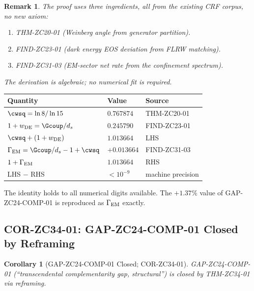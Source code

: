 \documentclass[12pt, a4paper]{article}
\newtheorem{corollary}{Corollary}[section]
\newtheorem{remark}{Remark}[section]
\begin{document}
\begin{remark}
The proof uses three ingredients, all from the existing CRF
corpus, no new axiom:
\begin{enumerate}[leftmargin=*, noitemsep]
  \item THM-ZC20-01 (Weinberg angle from generator partition).
  \item FIND-ZC23-01 (dark energy EOS deviation from FLRW
    matching).
  \item FIND-ZC31-03 (EM-sector net rate from the confinement
    spectrum).
\end{enumerate}
The derivation is algebraic; no numerical fit is required.
\end{remark}

\begin{derivedbox}[title={Numerical verification (THM-ZC34-01)}]
{\small
\renewcommand{\arraystretch}{1.30}
\begin{center}
\begin{tabular}{p{6.0cm}p{3.0cm}p{3.0cm}}
\toprule
\textbf{Quantity} & \textbf{Value} & \textbf{Source}\\
\midrule
$\cwsq = \ln 8/\ln 15$ & $0.767874$ & THM-ZC20-01\\
$1 + w_{\rm DE} = \Gcoup/d_s$ & $0.245790$ & FIND-ZC23-01\\
$\cwsq + (1+w_{\rm DE})$ & $1.013664$ & LHS\\
\midrule
$\Gamma_{\rm EM} = \Gcoup/d_s - 1 + \cwsq$ & $+0.013664$ & FIND-ZC31-03\\
$1 + \Gamma_{\rm EM}$ & $1.013664$ & RHS\\
\midrule
LHS $-$ RHS & $< 10^{-9}$ & machine precision\\
\bottomrule
\end{tabular}
\end{center}
}
\medskip
The identity holds to all numerical digits available. The
$+1.37\%$ value of GAP-ZC24-COMP-01 is reproduced as
$\Gamma_{\rm EM}$ exactly.
\end{derivedbox}

\subsection{COR-ZC34-01: GAP-ZC24-COMP-01 Closed by Reframing}
\label{sec:cor-01}

\begin{corollary}[GAP-ZC24-COMP-01 Closed; COR-ZC34-01]
\label{cor:zc34-01}
GAP-ZC24-COMP-01 (``transcendental complementarity gap,
structural'') is closed by THM-ZC34-01 via reframing.
\end{corollary}
\end{document}
